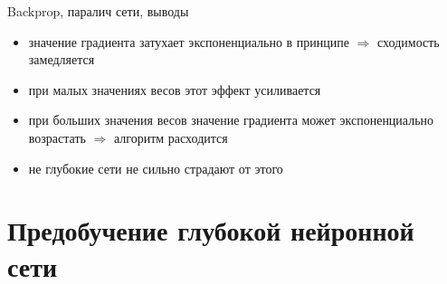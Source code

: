 \documentclass[10pt]{beamer}
\begin{document}
\begin{frame}{Backprop, паралич сети, выводы}

\begin{itemize}
	\item значение градиента затухает экспоненциально в принципе $\Rightarrow$ сходимость замедляется
	\item при малых значениях весов этот эффект усиливается
	\item при больших значения весов значение градиента может экспоненциально возрастать $\Rightarrow$ алгоритм расходится
	\item не глубокие сети не сильно страдают от этого
\end{itemize}

\end{frame}

\section{Предобучение глубокой нейронной сети}
\end{document}
